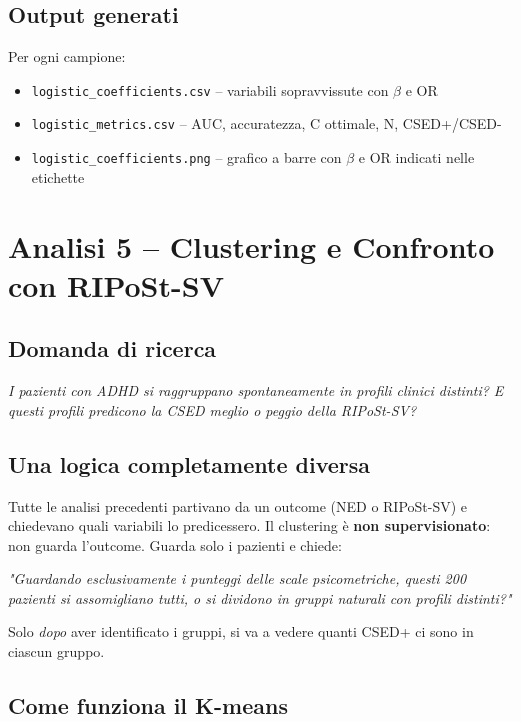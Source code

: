\documentclass[12pt, a4paper]{article}
\begin{document}
\subsection{Output generati}

Per ogni campione:
\begin{itemize}
    \item \texttt{logistic\_coefficients.csv} -- variabili sopravvissute con $\beta$ e OR
    \item \texttt{logistic\_metrics.csv} -- AUC, accuratezza, C ottimale, N, CSED+/CSED-
    \item \texttt{logistic\_coefficients.png} -- grafico a barre con $\beta$ e OR indicati
          nelle etichette
\end{itemize}

\section{Analisi 5 -- Clustering e Confronto con RIPoSt-SV}

\subsection{Domanda di ricerca}

\textit{I pazienti con ADHD si raggruppano spontaneamente in profili clinici distinti? E
questi profili predicono la CSED meglio o peggio della RIPoSt-SV?}

\subsection{Una logica completamente diversa}

Tutte le analisi precedenti partivano da un outcome (NED o RIPoSt-SV) e chiedevano quali
variabili lo predicessero. Il clustering è \textbf{non supervisionato}: non guarda l'outcome.
Guarda solo i pazienti e chiede:

\textit{"Guardando esclusivamente i punteggi delle scale psicometriche, questi 200 pazienti
si assomigliano tutti, o si dividono in gruppi naturali con profili distinti?"}

Solo \textit{dopo} aver identificato i gruppi, si va a vedere quanti CSED+ ci sono in
ciascun gruppo.

\subsection{Come funziona il K-means}
\end{document}

